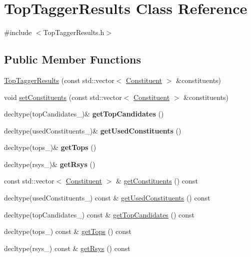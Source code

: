 \hypertarget{classTopTaggerResults}{\section{Top\-Tagger\-Results Class Reference}
\label{classTopTaggerResults}
}


{\ttfamily \#include $<$Top\-Tagger\-Results.\-h$>$}

\subsection*{Public Member Functions}
\begin{DoxyCompactItemize}
\item 
\hyperlink{classTopTaggerResults_a661fa9c839fd16be88ea1205cf274c7e}{Top\-Tagger\-Results} (const std\-::vector$<$ \hyperlink{classConstituent}{Constituent} $>$ \&constituents)
\item 
void \hyperlink{classTopTaggerResults_a2d7cf77c1e4591e6fbdf0b297a3f87bd}{set\-Constituents} (const std\-::vector$<$ \hyperlink{classConstituent}{Constituent} $>$ \&constituents)
\item 
\hypertarget{classTopTaggerResults_a36f6d9d5d0de2835f9d2eb904c937ba1}{decltype(top\-Candidates\-\_\-)\& {\bfseries get\-Top\-Candidates} ()}\label{classTopTaggerResults_a36f6d9d5d0de2835f9d2eb904c937ba1}

\item 
\hypertarget{classTopTaggerResults_a4a8dbb53762a071549d79297a4368881}{decltype(used\-Constituents\-\_\-)\& {\bfseries get\-Used\-Constituents} ()}\label{classTopTaggerResults_a4a8dbb53762a071549d79297a4368881}

\item 
\hypertarget{classTopTaggerResults_ac05c9403224d1146581d69486b1a3a29}{decltype(tops\-\_\-)\& {\bfseries get\-Tops} ()}\label{classTopTaggerResults_ac05c9403224d1146581d69486b1a3a29}

\item 
\hypertarget{classTopTaggerResults_a4fc99173e33deb2efc0f5d79f05d8c8b}{decltype(rsys\-\_\-)\& {\bfseries get\-Rsys} ()}\label{classTopTaggerResults_a4fc99173e33deb2efc0f5d79f05d8c8b}

\item 
const std\-::vector$<$ \hyperlink{classConstituent}{Constituent} $>$ \& \hyperlink{classTopTaggerResults_ac1cf35b9f88753c844265a33954c5678}{get\-Constituents} () const 
\item 
decltype(used\-Constituents\-\_\-) const \& \hyperlink{classTopTaggerResults_a515649da0d0d2a39e1f695a384e7f1e9}{get\-Used\-Constituents} () const 
\item 
decltype(top\-Candidates\-\_\-) const \& \hyperlink{classTopTaggerResults_af73f385ccfed5d95edceff6fce6c749b}{get\-Top\-Candidates} () const 
\item 
decltype(tops\-\_\-) const \& \hyperlink{classTopTaggerResults_a247c5fe21e474217d21059d9648367c5}{get\-Tops} () const 
\item 
decltype(rsys\-\_\-) const \& \hyperlink{classTopTaggerResults_a9618cf005aa6b206e70462ceeea5f6c4}{get\-Rsys} () const 
\end{DoxyCompactItemize}


